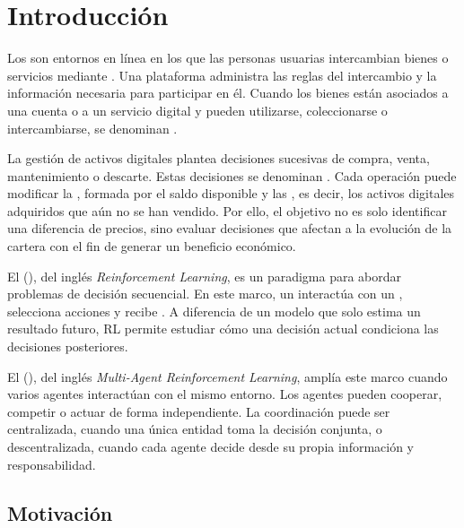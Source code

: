 \chapter{Introducción}

\noindent Los \textbf{} son entornos en línea en los que las personas usuarias intercambian bienes o servicios mediante \textbf{}. Una plataforma administra las reglas del intercambio y la información necesaria para participar en él. Cuando los bienes están asociados a una cuenta o a un servicio digital y pueden utilizarse, coleccionarse o intercambiarse, se denominan \textbf{}.

La gestión de activos digitales plantea decisiones sucesivas de compra, venta, mantenimiento o descarte. Estas decisiones se denominan \textbf{}. Cada operación puede modificar la \textbf{}, formada por el saldo disponible y las \textbf{}, es decir, los activos digitales adquiridos que aún no se han vendido. Por ello, el objetivo no es solo identificar una diferencia de precios, sino evaluar decisiones que afectan a la evolución de la cartera con el fin de generar un beneficio económico.

El \textbf{} (), del inglés \emph{Reinforcement Learning}, es un paradigma para abordar problemas de decisión secuencial. En este marco, un \textbf{} interactúa con un \textbf{}, selecciona acciones y recibe \textbf{}. A diferencia de un modelo que solo estima un resultado futuro, RL permite estudiar cómo una decisión actual condiciona las decisiones posteriores.

El \textbf{} (), del inglés \emph{Multi-Agent Reinforcement Learning}, amplía este marco cuando varios agentes interactúan con el mismo entorno. Los agentes pueden cooperar, competir o actuar de forma independiente. La coordinación puede ser centralizada, cuando una única entidad toma la decisión conjunta, o descentralizada, cuando cada agente decide desde su propia información y responsabilidad.

\section{Motivación}

